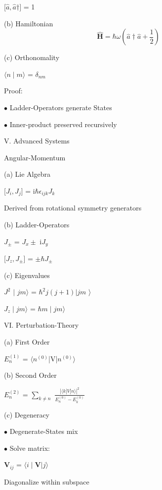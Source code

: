 \documentclass[a4paper, 10pt, onepage]{elegantbook}
\begin{document}
{    [$\hat a, \hat a{\dagger}]$ = 1 
    
(b) Hamiltonian
\begin{equation} \label{eq:Hamiltonian}
\mathbf{\hat H} = \hbar \omega (\hat a{\dagger} \hat a + \frac{1}{2})
\end{equation}

(c) Orthonomality  

$\langle n \mid m \rangle$ = $\delta_{nm}$ 

Proof:  
  
    $\bullet$ Ladder-Operators generate States  
  
    $\bullet$ Inner-product preserved recursively  

V. Advanced Systems 

Angular-Momentum  

(a) Lie Algebra 

[$J_i,J_j$] = i$\hbar \epsilon_{ijk} J_k$  
  
Derived from rotational symmetry generators 

(b) Ladder-Operators 

$J_\pm$ = $J_x \pm$ i$J_y$ 
 
[$J_z,J_\pm$] = $\pm \hbar J_\pm$  

(c) Eigenvalues  

$J^2$ $\mid$ ${jm} \rangle$ = $\hbar^2j(j + 1)| {jm}$ $\rangle$ 
 
$J_z \mid {jm} \rangle$ = $\hbar m \mid{jm} \rangle$  

VI. Perturbation-Theory  

(a) First Order  

$E_{n}^{(1)}$ = $\langle n^{(0)}$|V|$n^{(0)} \rangle$ 

(b) Second Order  
  
$E_{n}^{(2)}$ = $\sum_{k \neq n}$ $\frac{| \langle {k}|{V}|{n} \rangle |^2}{E_{n}^{(0)} - E_{k}^{(0)}}$ 
    
(c) Degeneracy 
 
$\bullet$ Degenerate-States mix 
 
$\bullet$ Solve matrix: 
  
    $\mathbf V_{ij}$ = $\langle i\mid \mathbf {V}|j \rangle$ 
 
    Diagonalize within subspace 

}
\end{document}
